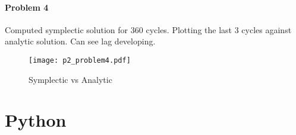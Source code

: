 \documentclass[12pt, oneside, letterpaper, fleqn]{article}
\begin{document}
\pagebreak
\paragraph{Problem 4}
Computed symplectic solution for 360 cycles. Plotting the last 3 cycles
against analytic solution. Can see lag developing.
\begin{figure}[htbp]
\caption{Symplectic vs Analytic}
\texttt{[image: p2\_problem4.pdf]}
\end{figure}

\appendix
\section{Python}

\end{document}
